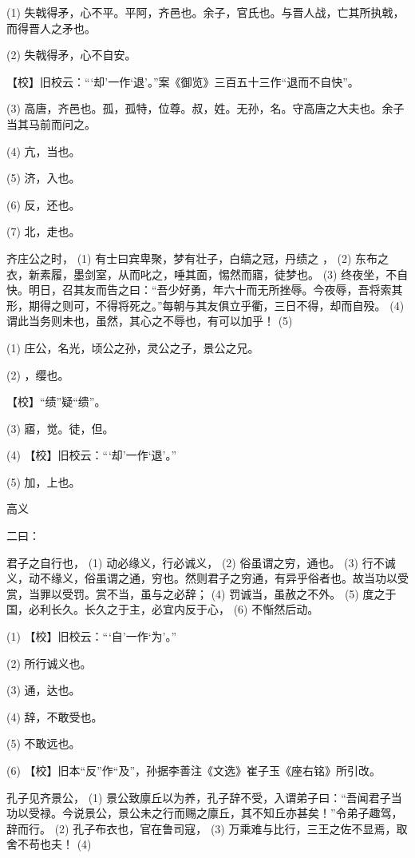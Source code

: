 \documentclass[12pt,UTF8]{ctexbook}
\begin{document}
(1) 失戟得矛，心不平。平阿，齐邑也。余子，官氏也。与晋人战，亡其所执戟，而得晋人之矛也。

(2) 失戟得矛，心不自安。

【校】旧校云：“‘却’一作‘退’。”案《御览》三百五十三作“退而不自快”。

(3) 高唐，齐邑也。孤，孤特，位尊。叔，姓。无孙，名。守高唐之大夫也。余子当其马前而问之。

(4) 亢，当也。

(5) 济，入也。

(6) 反，还也。

(7) 北，走也。

齐庄公之时， (1) 有士曰宾卑聚，梦有壮子，白缟之冠，丹绩之 ， (2) 东布之衣，新素履，墨剑室，从而叱之，唾其面，惕然而寤，徒梦也。 (3) 终夜坐，不自快。明日，召其友而告之曰：“吾少好勇，年六十而无所挫辱。今夜辱，吾将索其形，期得之则可，不得将死之。”每朝与其友俱立乎衢，三日不得，却而自殁。 (4) 谓此当务则未也，虽然，其心之不辱也，有可以加乎！ (5)

(1) 庄公，名光，顷公之孙，灵公之子，景公之兄。

(2) ，缨也。

【校】“绩”疑“缋”。

(3) 寤，觉。徒，但。

(4) 【校】旧校云：“‘却’一作‘退’。”

(5) 加，上也。





高义


二曰：

君子之自行也， (1) 动必缘义，行必诚义， (2) 俗虽谓之穷，通也。 (3) 行不诚义，动不缘义，俗虽谓之通，穷也。然则君子之穷通，有异乎俗者也。故当功以受赏，当罪以受罚。赏不当，虽与之必辞； (4) 罚诚当，虽赦之不外。 (5) 度之于国，必利长久。长久之于主，必宜内反于心， (6) 不惭然后动。

(1) 【校】旧校云：“‘自’一作‘为’。”

(2) 所行诚义也。

(3) 通，达也。

(4) 辞，不敢受也。

(5) 不敢远也。

(6) 【校】旧本“反”作“及”，孙据李善注《文选》崔子玉《座右铭》所引改。

孔子见齐景公， (1) 景公致廪丘以为养，孔子辞不受，入谓弟子曰：“吾闻君子当功以受禄。今说景公，景公未之行而赐之廪丘，其不知丘亦甚矣！”令弟子趣驾，辞而行。 (2) 孔子布衣也，官在鲁司寇， (3) 万乘难与比行，三王之佐不显焉，取舍不苟也夫！ (4)
\end{document}
